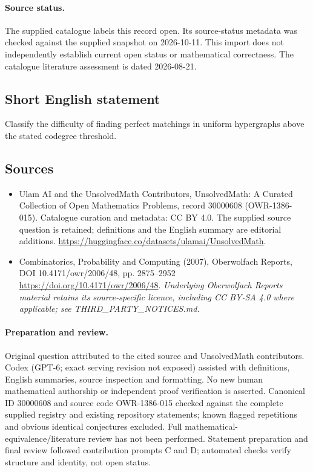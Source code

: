 \documentclass[11pt]{article}
\begin{document}
\paragraph{Source status.}
The supplied catalogue labels this record open. Its source-status metadata was checked against the supplied snapshot on 2026-10-11. This import does not independently establish current open status or mathematical correctness. The catalogue literature assessment is dated 2026-08-21.
\subsection{Short English statement}
Classify the difficulty of finding perfect matchings in uniform hypergraphs above the stated codegree threshold.
\subsection{Sources}
\begin{itemize}
\item[S1] Ulam AI and the UnsolvedMath Contributors, UnsolvedMath: A Curated Collection of Open Mathematics Problems, record 30000608 (OWR-1386-015). Catalogue curation and metadata: CC BY 4.0. The supplied source question is retained; definitions and the English summary are editorial additions.
\url{https://huggingface.co/datasets/ulamai/UnsolvedMath}.
\item[S2] Combinatorics, Probability and Computing (2007), Oberwolfach Reports, DOI 10.4171/owr/2006/48, pp. 2875--2952
\url{https://doi.org/10.4171/owr/2006/48}.
\textit{Underlying Oberwolfach Reports material retains its source-specific licence, including CC BY-SA 4.0 where applicable; see THIRD\_PARTY\_NOTICES.md.}
\end{itemize}
\paragraph{Preparation and review.}
Original question attributed to the cited source and UnsolvedMath contributors. Codex (GPT-6; exact serving revision not exposed) assisted with definitions, English summaries, source inspection and formatting. No new human mathematical authorship or independent proof verification is asserted. Canonical ID 30000608 and source code OWR-1386-015 checked against the complete supplied registry and existing repository statements; known flagged repetitions and obvious identical conjectures excluded. Full mathematical-equivalence/literature review has not been performed. Statement preparation and final review followed contribution prompts C and D; automated checks verify structure and identity, not open status.
\label{end:30000608}
\end{document}
